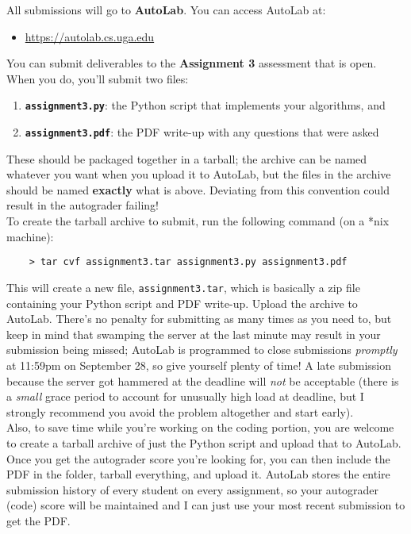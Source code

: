 \documentclass[paper=a4, fontsize=11pt]{scrartcl} %
\numberwithin{figure}{section} %
\numberwithin{table}{section} %
\begin{document}
All submissions will go to \textbf{AutoLab}. You can access AutoLab at:

\begin{itemize}
	\item \url{https://autolab.cs.uga.edu}
\end{itemize}

You can submit deliverables to the \textbf{Assignment 3} assessment that is open. When you do, you'll submit two files:

\begin{enumerate}
	\item \texttt{\textbf{assignment3.py}}: the Python script that implements your algorithms, and
	\item \texttt{\textbf{assignment3.pdf}}: the PDF write-up with any questions that were asked
\end{enumerate}

These should be packaged together in a tarball; the archive can be named whatever you want when you upload it to AutoLab, but the files in the archive should be named \textbf{exactly} what is above. Deviating from this convention could result in the autograder failing! \\

To create the tarball archive to submit, run the following command (on a *nix machine):

\begin{verbatim}
	> tar cvf assignment3.tar assignment3.py assignment3.pdf
\end{verbatim}

This will create a new file, \texttt{assignment3.tar}, which is basically a zip file containing your Python script and PDF write-up. Upload the archive to AutoLab. There's no penalty for submitting as many times as you need to, but keep in mind that swamping the server at the last minute may result in your submission being missed; AutoLab is programmed to close submissions \emph{promptly} at 11:59pm on September 28, so give yourself plenty of time! A late submission because the server got hammered at the deadline will \emph{not} be acceptable (there is a \emph{small} grace period to account for unusually high load at deadline, but I strongly recommend you avoid the problem altogether and start early). \\

Also, to save time while you're working on the coding portion, you are welcome to create a tarball archive of just the Python script and upload that to AutoLab. Once you get the autograder score you're looking for, you can then include the PDF in the folder, tarball everything, and upload it. AutoLab stores the entire submission history of every student on every assignment, so your autograder (code) score will be maintained and I can just use your most recent submission to get the PDF.
\end{document}
